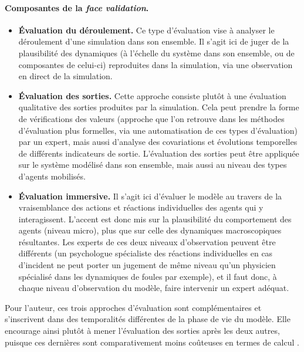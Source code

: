 \paragraph{Composantes de la \textit{face validation}.}\label{par:composantes-face-validation}
\begin{itemize}
	\item \textbf{Évaluation du déroulement.} Ce type d'évaluation vise à analyser le déroulement d'une simulation dans son ensemble.
	Il s'agit ici de juger de la plausibilité des dynamiques (à l'échelle du système dans son ensemble, ou de composantes de celui-ci) reproduites dans la simulation, via une observation en direct de la simulation.
	
	\item \textbf{Évaluation des sorties.} Cette approche consiste plutôt à une évaluation qualitative des sorties produites par la simulation.
	Cela peut prendre la forme de vérifications des valeurs (approche que l'on retrouve dans les méthodes d'évaluation plus formelles, via une automatisation de ces types d'évaluation) par un expert, mais aussi d'analyse des covariations et évolutions temporelles de différents indicateurs de sortie.
	L'évaluation des sorties peut être appliquée sur le système modélisé dans son ensemble, mais aussi au niveau des types d'agents mobilisés.
	
	\item \textbf{Évaluation \og immersive\fg{}.} Il s'agit ici d'évaluer le modèle au travers de la vraisemblance des actions et réactions individuelles des agents qui y interagissent.
	L'accent est donc mis sur la plausibilité du comportement des agents (niveau micro), plus que sur celle des dynamiques macroscopiques résultantes.
	Les experts de ces deux niveaux d'observation peuvent être différents (un psychologue spécialiste des réactions individuelles en cas d'incident ne peut porter un jugement de même niveau qu'un physicien spécialisé dans les dynamiques de foules par exemple), et il faut donc, à chaque niveau d'observation du modèle, faire intervenir un expert adéquat.
\end{itemize}


Pour l'auteur, ces trois approches d'évaluation sont complémentaires et s'inscrivent dans des temporalités différentes de la phase de vie du modèle.
Elle encourage ainsi plutôt à mener l'évaluation des sorties après les deux autres, puisque ces dernières sont comparativement moins coûteuses en termes de calcul \autocite[42]{klugl_validation_2008}.

